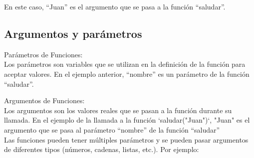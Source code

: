En este caso, ``Juan'' es el argumento que se pasa a la función ``saludar''.

\subsection{Argumentos y parámetros}
Parámetros de Funciones:\\

Los parámetros son variables que se utilizan en la definición de la función para aceptar valores. En el ejemplo anterior, ``nombre'' es un parámetro de la función ``saludar''.
\begin{figure}[h]
    \centering
  \end{figure}

Argumentos de Funciones:\\

Los argumentos son los valores reales que se pasan a la función durante su llamada. En el ejemplo de la llamada a la función `saludar("Juan")`, "Juan" es el argumento que se pasa al parámetro ``nombre'' de la función ``saludar''\\

Las funciones pueden tener múltiples parámetros y se pueden pasar argumentos de diferentes tipos (números, cadenas, listas, etc.). Por ejemplo:

\begin{figure}[h]
    \centering
  \end{figure}

